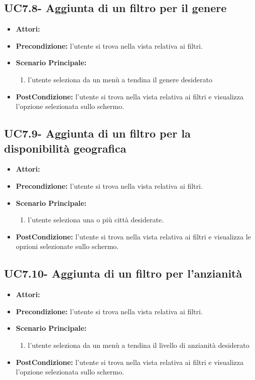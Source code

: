 \subsection{UC7.8- Aggiunta di un filtro per il genere}
\begin{itemize}
	\item \textbf{Attori:}\loggedusr
	\item \textbf{Precondizione:} l'utente si trova nella vista relativa ai filtri.
	\item \textbf{Scenario Principale:}
	\begin{enumerate}
		\item l'utente seleziona da un menù a tendina il genere desiderato
	\end{enumerate}
	\item \textbf{PostCondizione:}  l'utente si trova nella vista relativa ai filtri e visualizza l'opzione selezionata sullo schermo.
\end{itemize}

\subsection{UC7.9- Aggiunta di un filtro per la disponibilità geografica}
\begin{itemize}
	\item \textbf{Attori:}\loggedusr
	\item \textbf{Precondizione:} l'utente si trova nella vista relativa ai filtri.
	\item \textbf{Scenario Principale:}
	\begin{enumerate}
		\item l'utente seleziona una o più città desiderate.
	\end{enumerate}
	\item \textbf{PostCondizione:}  l'utente si trova nella vista relativa ai filtri e visualizza le opzioni selezionate sullo schermo.
\end{itemize}

\subsection{UC7.10- Aggiunta di un filtro per l'anzianità}
\begin{itemize}
	\item \textbf{Attori:}\loggedusr
	\item \textbf{Precondizione:} l'utente si trova nella vista relativa ai filtri.
	\item \textbf{Scenario Principale:}
	\begin{enumerate}
		\item l'utente seleziona da un menù a tendina il livello di anzianità desiderato
	\end{enumerate}
	\item \textbf{PostCondizione:}  l'utente si trova nella vista relativa ai filtri e visualizza l'opzione selezionata sullo schermo.
\end{itemize}

